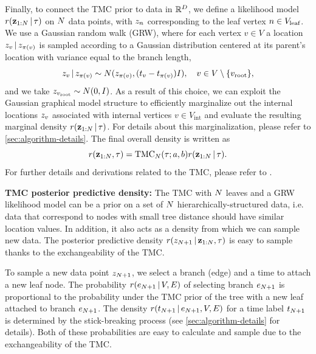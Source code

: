 Finally, to connect the TMC prior to data in $\mathbb{R}^D$, we define a likelihood model $r(\mathbf{z}_{1:N} \,|\, \tau)$ on $N$ data points, with $z_n$ corresponding to the leaf vertex $n \in V_\text{leaf}$.
We use a Gaussian random walk (GRW), where for each vertex $v \in V$ a location $z_v \,|\, z_{\pi(v)}$ is sampled according to a Gaussian distribution centered at its parent's location with variance equal to the branch length,
\begin{equation}
    z_v \,|\, z_{\pi(v)} \sim N(z_{\pi(v)}, (t_v - t_{\pi(v)})I), \quad v \in V \setminus \{v_\text{root}\},
    \notag
\end{equation}
and we take $z_{v_\text{root}} \sim N(0, I)$.
As a result of this choice, we can exploit the Gaussian graphical model structure to efficiently marginalize out the internal locations $z_v$ associated with internal vertices $v \in V_\text{int}$ and evaluate the resulting marginal density $r(\mathbf{z}_{1:N} \,|\, \tau)$. For details
about this marginalization, please refer to \autoref{sec:algorithm-details}.
The final overall density is written as
\begin{equation}
    r(\mathbf{z}_{1:N}, \tau) = \mathrm{TMC}_N(\tau; a, b)r(\mathbf{z}_{1:N} \,|\, \tau).
\end{equation}
For further details and derivations related to the TMC,
please refer to \citet{Boyles2012}.

\textbf{TMC posterior predictive density:}
The TMC with $N$ leaves and a GRW likelihood model can be a prior on a set of $N$ hierarchically-structured data, i.e. data that correspond to nodes with small tree distance should have similar location values.
In addition, it also acts as a density from which we can sample new data.
The posterior predictive density $r(z_{N + 1} \,|\, \mathbf{z}_{1:N}, \tau)$ is easy to sample thanks to the exchangeability of the TMC.

To sample a new data point $z_{N + 1}$, we select a branch (edge) and a time to attach a new leaf node.
The probability $r(e_{N+1} \,|\, V, E)$ of selecting branch $e_{N+1}$ is proportional to the probability under the TMC prior of the tree with a new leaf attached to branch $e_{N+1}$.
The density $r(t_{N+1} \,|\, e_{N+1}, V, E)$ for a time label $t_{N+1}$ is determined by the stick-breaking process (see \autoref{sec:algorithm-details} for details).
Both of these probabilities are easy to calculate and sample due to the exchangeability of the TMC.

